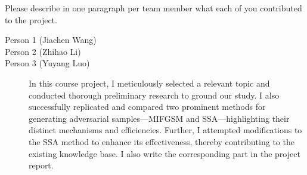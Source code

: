 Please describe in one paragraph per team member what each of you contributed to the project.
\begin{description}
\item[Person 1 (Jiachen Wang)] 
\item[Person 2 (Zhihao Li)] 
\item [Person 3 (Yuyang Luo)] In this course project, I meticulously selected a relevant topic and conducted thorough preliminary research to ground our study. I also successfully replicated and compared two prominent methods for generating adversarial samples—MIFGSM and SSA—highlighting their distinct mechanisms and efficiencies. Further, I attempted modifications to the SSA method to enhance its effectiveness, thereby contributing to the existing knowledge base. I also write the corresponding part in the project report.

\end{description}


